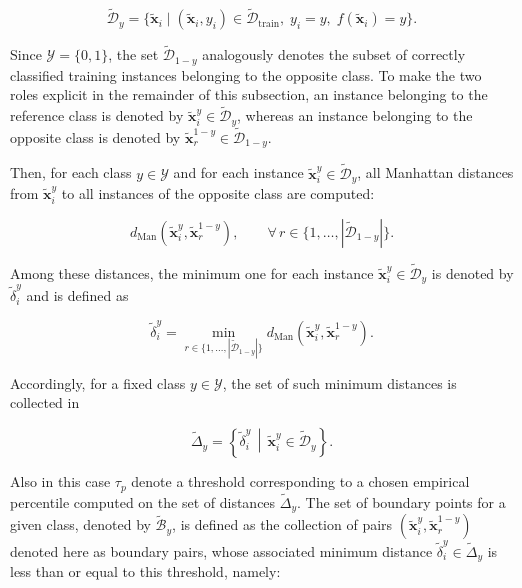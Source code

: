 \begin{equation}
  \widetilde{\mathcal{D}}_{y} = \{ \tilde{\mathbf{x}}_i \mid (\tilde{\mathbf{x}}_i, y_i) \in \widetilde{\mathcal{D}}_{\mathrm{train}}, \; y_i = y, \; f(\tilde{\mathbf{x}}_i) = y \}.
\end{equation}

Since $\mathcal{Y}=\{0,1\}$, the set $\widetilde{\mathcal{D}}_{1-y}$ analogously denotes the subset of correctly classified training instances belonging to the opposite class. To make the two roles explicit in the remainder of this subsection, an instance belonging to the reference class is denoted by $\tilde{\mathbf{x}}^{y}_i \in \widetilde{\mathcal{D}}_y$, whereas an instance belonging to the opposite class is denoted by $\tilde{\mathbf{x}}^{1-y}_r \in \widetilde{\mathcal{D}}_{1-y}$.

Then, for each class $y \in \mathcal{Y}$ and for each instance $\tilde{\mathbf{x}}^{y}_i \in \widetilde{\mathcal{D}}_{y}$, all Manhattan distances from $\tilde{\mathbf{x}}^{y}_i$ to all instances of the opposite class are computed:

\begin{equation}
  d_{\mathrm{Man}}\!\left(\tilde{\mathbf{x}}^{y}_i, \tilde{\mathbf{x}}^{1-y}_r\right), \qquad \forall \, r \in \{1, \ldots, |\widetilde{\mathcal{D}}_{1-y}|\}.
\end{equation}

Among these distances, the minimum one for each instance $\tilde{\mathbf{x}}^{y}_i \in \widetilde{\mathcal{D}}_{y}$ is denoted by $\widetilde{\delta}_i^{y}$ and is defined as

\begin{equation}
  \widetilde{\delta}_i^{y} = \min_{r \in \{1, \ldots, |\widetilde{\mathcal{D}}_{1-y}|\}} d_{\mathrm{Man}}\!\left(\tilde{\mathbf{x}}^{y}_i, \tilde{\mathbf{x}}^{1-y}_r\right).
\end{equation}

Accordingly, for a fixed class $y \in \mathcal{Y}$, the set of such minimum distances is collected in

\begin{equation}
  \widetilde{\Delta}_{y} = \left\{ \widetilde{\delta}_i^{y} \, \middle| \, \tilde{\mathbf{x}}^{y}_i \in \widetilde{\mathcal{D}}_{y} \right\}.
\end{equation}

Also in this case $\tau_p$ denote a threshold corresponding to a chosen empirical percentile computed on the set of distances $\widetilde{\Delta}_{y}$. The set of boundary points for a given class, denoted by $\widetilde{\mathcal{B}}_y$, is defined as the collection of pairs $(\tilde{\mathbf{x}}^{y}_i, \tilde{\mathbf{x}}^{1-y}_r)$ denoted here as boundary pairs, whose associated minimum distance $\widetilde{\delta}_i^{y} \in \widetilde{\Delta}_{y}$ is less than or equal to this
threshold, namely:

